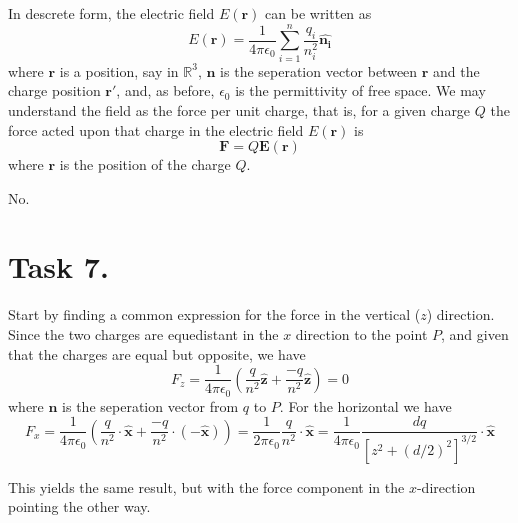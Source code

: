 \documentclass[a4paper,11pt]{article}
\begin{document}
\begin{romanlist}
    \item In descrete form, the electric field $E(\mathbf{r})$ can be written as
        \[
            E(\mathbf{r}) = \frac{1}{4\pi \epsilon_0} \sum_{i = 1}^{n} \frac{q_i}{n_i^2}\mathbf{\hat{n_i}}
        \]
        where $\mathbf{r}$ is a position, say in $\mathbb{R}^3$, $\mathbf{n}$ is the seperation vector between $\mathbf{r}$ and the 
        charge position $\mathbf{r'}$, and, as before, $\epsilon_0$ is the permittivity of free space. We may understand the field as the force per 
        unit charge, that is, for a given charge $Q$ the force acted upon that charge in the electric field $E(\mathbf{r})$ is 
        \[
            \mathbf{F} = Q\mathbf{E}(\mathbf{r})
        \]
        where $\mathbf{r}$ is the position of the charge $Q$.
    \item No.
\end{romanlist}

\section*{Task 7.}
\begin{romanlist}
    \item Start by finding a common expression for the force in the vertical ($z$) direction. Since the two charges are equedistant in the $x$ direction
        to the point $P$, and given that the charges are equal but opposite, we have
        \[
            F_z = \frac{1}{4\pi \epsilon_0} \left(
                \frac{q}{n^2}\mathbf{\hat{z}} + \frac{-q}{n^2}\mathbf{\hat{z}}
            \right) = 0
        \]
        where $\mathbf{n}$ is the seperation vector from $q$ to $P$.
        For the horizontal we have
        \[
            F_x = \frac{1}{4\pi \epsilon_0} \left(
                \frac{q}{n^2} \cdot \mathbf{\hat{x}} + \frac{-q}{n^2} \cdot (-\mathbf{\hat{x}})
            \right) = \frac{1}{2\pi \epsilon_0} \frac{q}{n^2} \cdot \mathbf{\hat{x}} = \frac{1}{4\pi \epsilon_0} \frac{dq}{\left[z^2 + (d/2)^2\right]^{3/2}} \cdot \mathbf{\hat{x}}
        \]
    \item This yields the same result, but with the force component in the $x$-direction pointing the other way.
\end{romanlist}
\end{document}

